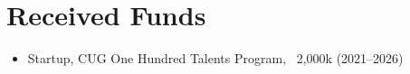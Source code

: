 \section{Received Funds}

\begin{itemize}
\item Startup, CUG One Hundred Talents Program, \textyen\ 2,000k (2021--2026)
\end{itemize}

